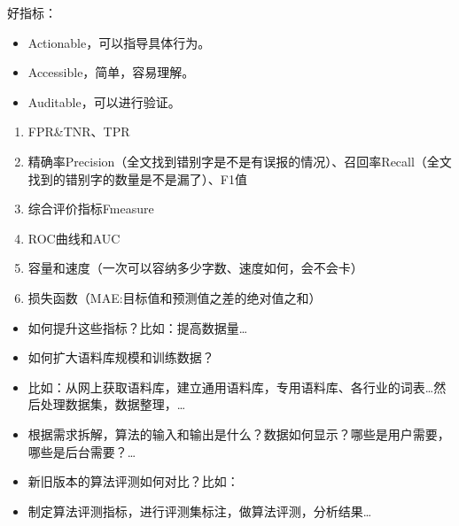 \documentclass[letterpaper,11pt,english]{sphinxmanual}
\begin{document}
好指标：
\begin{itemize}
\item {} 
Actionable，可以指导具体行为。

\item {} 
Accessible，简单，容易理解。

\item {} 
Auditable，可以进行验证。

\end{itemize}
\begin{enumerate}
%
\item {} 
FPR\&TNR、TPR

\item {} 
精确率Precision（全文找到错别字是不是有误报的情况）、召回率Recall（全文找到的错别字的数量是不是漏了）、F1值

\item {} 
综合评价指标F\sphinxhyphen{}measure

\item {} 
ROC曲线和AUC

\item {} 
容量和速度（一次可以容纳多少字数、速度如何，会不会卡）

\item {} 
损失函数（MAE:目标值和预测值之差的绝对值之和）

\end{enumerate}
\begin{itemize}
\item {} 
如何提升这些指标？比如：提高数据量…

\item {} 
如何扩大语料库规模和训练数据？

\item {} 
比如：从网上获取语料库，建立通用语料库，专用语料库、各行业的词表…然后处理数据集，数据整理，…

\item {} 
根据需求拆解，算法的输入和输出是什么？数据如何显示？哪些是用户需要，哪些是后台需要？…

\item {} 
新旧版本的算法评测如何对比？比如：

\item {} 
制定算法评测指标，进行评测集标注，做算法评测，分析结果…

\end{itemize}
\end{document}
